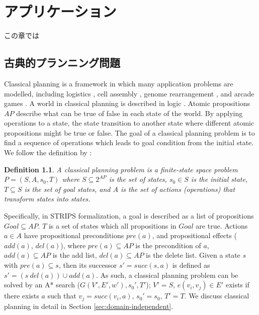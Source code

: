 \documentclass{book}
\newtheorem{definition}{Definition}
\begin{document}
\chapter{アプリケーション}

この章では

\section{古典的プランニング問題}

Classical planning is a framework in which many application problems are modelled, including logistics \cite{helmert2010scanalyzer,sousa2013toward}, cell assembly \cite{asai2014fully}, genome rearrangement \cite{erdem2005genome}, and arcade games \cite{Lipovetzky2015a,jinnai2017learning}.
A world in classical planning is described in logic \cite{fikes:71}. Atomic propositions $AP$ describe what can be true of false in each state of the world. By applying operations to a state, the state transition to another state where different atomic propositions might be true or false. The goal of a classical planning problem is to find a sequence of operations which leads to goal condition from the initial state.
We follow the definition by \cite{edelkamp:2010:hst:1875144}:

\begin{definition}
A classical planning problem is a finite-state space problem $P = (S,A,s_0,T)$ where $S \subseteq 2^{AP}$ is the set of states, $s_0 \in S$ is the initial state, $T \subseteq S$ is the set of goal states, and $A$ is the set of actions (operations) that transform states into states.
\end{definition}

Specifically, in STRIPS formalization, a goal is described as a list of propositions $Goal \subseteq AP$. $T$ is a set of states which all propositions in $Goal$ are true.
Actions $a \in A$ have propositional preconditions $pre(a)$, and propositional effects ($add(a)$, $del(a)$), where $pre(a) \subseteq AP$ is the precondition of $a$, $add(a) \subseteq AP$ is the add list, $del(a) \subseteq AP$ is the delete list. Given a state $s$ with $pre(a) \subseteq s$, then its successor $s' = succ(s, a)$ is defined as $s' = (s \ del(a)) \cup add(a)$.
As such, a classical planning problem can be solved by an A* search ($G(V', E', w'), s_0', T'$); $V' = S$, $e(v_i, v_j) \in E'$ exists if there exists $a$ such that $v_j = succ(v_i, a)$, $s_0' = s_0$, $T' = T$.
We discuss classical planning in detail in Section \ref{sec:domain-independent}.
\end{document}
